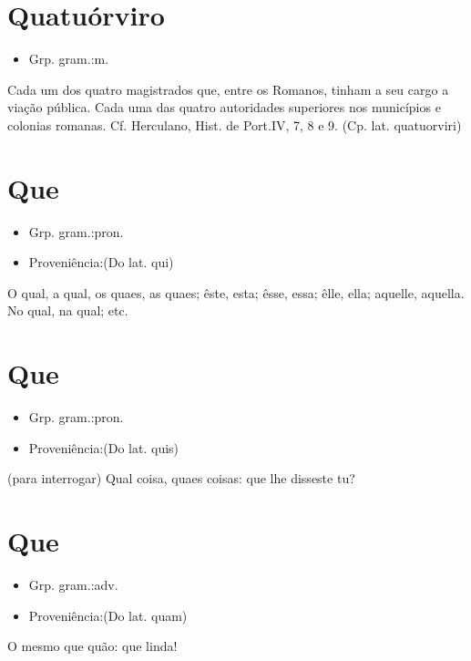 \section{Quatuórviro}
\begin{itemize}
\item {Grp. gram.:m.}
\end{itemize}
Cada um dos quatro magistrados que, entre os Romanos, tinham a seu cargo a viação pública.
Cada uma das quatro autoridades superiores nos municípios e colonias romanas. Cf. Herculano, \textunderscore Hist. de Port.\textunderscore  IV, 7, 8 e 9.
(Cp. lat. \textunderscore quatuorviri\textunderscore )
\section{Que}
\begin{itemize}
\item {Grp. gram.:pron.}
\end{itemize}
\begin{itemize}
\item {Proveniência:(Do lat. \textunderscore qui\textunderscore )}
\end{itemize}
O qual, a qual, os quaes, as quaes; êste, esta; êsse, essa; êlle, ella; aquelle, aquella.
No qual, na qual; etc.
\section{Que}
\begin{itemize}
\item {Grp. gram.:pron.}
\end{itemize}
\begin{itemize}
\item {Proveniência:(Do lat. \textunderscore quis\textunderscore )}
\end{itemize}
(\textunderscore para interrogar\textunderscore )
Qual coisa, quaes coisas: \textunderscore que lhe disseste tu\textunderscore ?
\section{Que}
\begin{itemize}
\item {Grp. gram.:adv.}
\end{itemize}
\begin{itemize}
\item {Proveniência:(Do lat. \textunderscore quam\textunderscore )}
\end{itemize}
O mesmo que \textunderscore quão\textunderscore : \textunderscore que linda\textunderscore !
